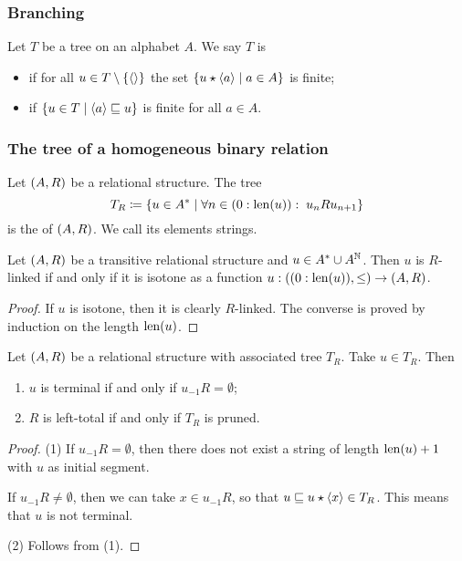 \subsubsection{Branching}
\begin{definition}
Let $T$ be a tree on an alphabet $A$. We say $T$ is
\begin{itemize}
\item {} if for all $u\in T\setminus\{\left\langle  \right\rangle\}$ the set $\setbuilder{u\concat\seq{a}}{a\in A}$ is finite;
\item {} if $\setbuilder{u\in T}{\seq{a}\sqsubseteq u}$ is finite for all $a\in A$.
\end{itemize}
\end{definition}

\subsubsection{The tree of a homogeneous binary relation}
\begin{definition}
Let $\sSet{A,R}$ be a relational structure. The tree
\[ T_R \defeq \setbuilder{u\in A^*}{\forall n\in (0:\len(u)): \; u_nRu_{n+1}} \]
is the  of $\sSet{A,R}$. We call its elements  strings.
\end{definition}

\begin{lemma} \label{TransitiveRlinkedStringSequence}
Let $\sSet{A,R}$ be a transitive relational structure and $u\in A^* \cup A^{\mathbb{N}}$. Then $u$ is $R$-linked \textup{if and only if} it is isotone as a function $u: \sSet{(0:\len(u)), \leq} \to \sSet{A,R}$.
\end{lemma}
\begin{proof}
If $u$ is isotone, then it is clearly $R$-linked. The converse is proved by induction on the length $\operatorname{len}(u)$.
\end{proof}

\begin{lemma} \label{relationalTreeLemma}
Let $\sSet{A,R}$ be a relational structure with associated tree $T_R$. Take $u\in T_R$. Then
\begin{enumerate}
\item $u$ is terminal \textup{if and only if} $u_{-1}R = \emptyset$;
\item $R$ is left-total \textup{if and only if} $T_R$ is pruned.
\end{enumerate}
\end{lemma}
\begin{proof}
(1) If $u_{-1}R = \emptyset$, then there does not exist a string of length $\operatorname{len}(u)+1$ with $u$ as initial segment.

If $u_{-1}R \neq \emptyset$, then we can take $x\in u_{-1}R$, so that $u \sqsubseteq u\star\left\langle x \right\rangle \in T_R$. This means that $u$ is not terminal.

(2) Follows from (1).
\end{proof}

